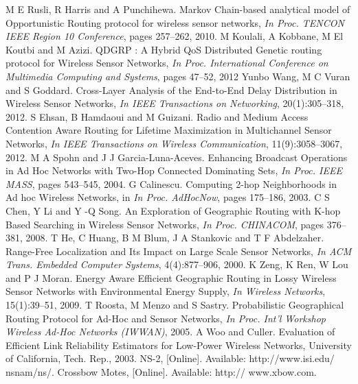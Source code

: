 \documentclass[fleqn,twoside]{article}
\begin{document}
\begin{thebibliography}{36}
M E Rusli, R Harris and A Punchihewa. {Markov Chain-based analytical
  model of Opportunistic Routing protocol for wireless sensor networks}, 
  \emph{In Proc. TENCON IEEE Region 10 Conference}, pages 257--262, 2010.
M Koulali, A Kobbane, M El Koutbi and M Azizi. {QDGRP : A Hybrid QoS
  Distributed Genetic routing protocol for Wireless Sensor Networks},
  \emph{In Proc. International Conference on Multimedia Computing and Systems}, pages 47--52, 2012
Yunbo Wang, M C Vuran and S Goddard. {Cross-Layer Analysis of the
  End-to-End Delay Distribution in Wireless Sensor Networks}, \emph{In IEEE
  Transactions on Networking}, 20(1):305--318, 2012.
S Ehsan, B Hamdaoui and M Guizani. {Radio and Medium Access Contention
  Aware Routing for Lifetime Maximization in Multichannel Sensor Networks},
  \emph{In IEEE Transactions on Wireless Communication}, 11(9):3058--3067, 2012.
M A Spohn and J J Garcia-Luna-Aceves. {Enhancing Broadcast Operations
  in Ad Hoc Networks with Two-Hop Connected Dominating Sets}, \emph{In Proc.
  IEEE MASS}, pages 543--545, 2004.
G Calinescu. {Computing 2-hop Neighborhoods in Ad hoc Wireless
  Networks}, in \emph{In Proc. AdHocNow}, pages 175--186, 2003.
C S Chen, Y Li and Y -Q Song. {An Exploration of Geographic Routing
  with K-hop Based Searching in Wireless Sensor Networks}, \emph{In Proc.
  CHINACOM}, pages 376--381, 2008.
T He, C Huang, B M Blum, J A Stankovic and T F Abdelzaher.
  {Range-Free Localization and Its Impact on Large Scale Sensor Networks},
  \emph{In ACM Trans. Embedded Computer Systems}, 4(4):877--906,
  2000.
K Zeng, K Ren, W Lou and P J Moran. {Energy Aware Efficient Geographic
  Routing in Lossy Wireless Sensor Networks with Environmental Energy
  Supply}, \emph{In Wireless Networks}, 15(1):39--51, 2009.
T Roosta, M Menzo and S Sastry. {Probabilistic Geographical Routing
  Protocol for Ad-Hoc and Sensor Networks}, \emph{In Proc. Int’l Workshop
  Wireless Ad-Hoc Networks (IWWAN)}, 2005.
A Woo and Culler. {Evaluation of Efficient Link Reliability Estimators for
  Low-Power Wireless Networks}, University of California, Tech. Rep., 2003.
NS-2, [Online]. Available: http://www.isi.edu/ nsnam/ns/.
Crossbow Motes, [Online]. Available: http:// www.xbow.com.\\\\
\small
\balance
\end{thebibliography}
\end{document}
